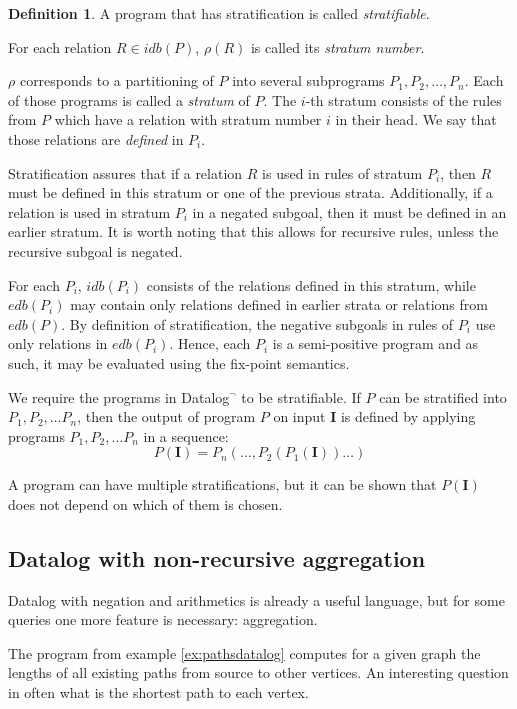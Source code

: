\documentclass{pracamgr}
\theoremstyle{plain}
\theoremstyle{definition}
\newtheorem{defn}{Definition}[section]
\theoremstyle{remark}
\newcommand{\datalogneg}{Datalog$^{\neg}$ }
\begin{document}
\begin{defn}
A program that has stratification is called \emph{stratifiable}.
\end{defn}

For each relation $R \in idb(P )$, $\rho(R)$ is called its \emph{stratum number}.

$\rho$ corresponds to a partitioning of $P$ into several subprograms $P_1, P_2, \dots, P_n$. Each of those programs is called a \emph{stratum} of $P$. The $i$-th stratum consists of the rules from $P$ which have a relation with stratum number $i$ in their head. We say that those relations are \emph{defined} in $P_i$.

Stratification assures that if a relation $R$ is used in rules of stratum $P_i$, then $R$ must be defined in this stratum or one of the previous strata. Additionally, if a relation is used in stratum $P_i$ in a negated subgoal, then it must be defined in an earlier stratum. It is worth noting that this allows for recursive rules, unless the recursive subgoal is negated.

For each $P_i$, $idb(P_i)$ consists of the relations defined in this stratum, while $edb(P_i)$ may contain only relations defined in earlier strata or relations from $edb(P)$. By definition of stratification, the negative subgoals in rules of $P_i$ use only relations in $edb(P_i)$. Hence, each $P_i$ is a semi-positive program and as such, it may be evaluated using the fix-point semantics.

We require the programs in \datalogneg to be stratifiable. If $P$ can be stratified into $P_1, P_2, \dots P_n$, then the output of program $P$ on input $\textbf{I}$ is defined by applying programs $P_1, P_2, \dots P_n$ in a sequence:
$$P(\textbf{I}) = P_n(\dots, P_2(P_1(\textbf{I}))\dots)$$

A program can have multiple stratifications, but it can be shown that $P(\textbf{I})$ does not depend on which of them is chosen.

\subsection{Datalog with non-recursive aggregation}\label{ss:datalognra}

Datalog with negation and arithmetics is already a useful language, but for some queries one more feature is necessary: aggregation.

The program from example \ref{ex:pathsdatalog} computes for a given graph the lengths of all existing paths from source to other vertices. An interesting question in often what is the shortest path to each vertex.
\end{document}
